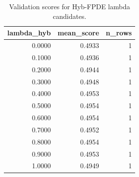 \begin{table}[t]
\caption{Validation scores for Hyb-FPDE lambda candidates.}
\label{tab:lambda_distribution_computed}
\centering
\begin{tabular}{rrr}
\toprule
lambda\_hyb & mean\_score & n\_rows \\
\midrule
0.0000 & 0.4933 & 1 \\
0.1000 & 0.4936 & 1 \\
0.2000 & 0.4944 & 1 \\
0.3000 & 0.4948 & 1 \\
0.4000 & 0.4953 & 1 \\
0.5000 & 0.4954 & 1 \\
0.6000 & 0.4954 & 1 \\
0.7000 & 0.4952 & 1 \\
0.8000 & 0.4954 & 1 \\
0.9000 & 0.4953 & 1 \\
1.0000 & 0.4949 & 1 \\
\bottomrule
\end{tabular}

\end{table}
